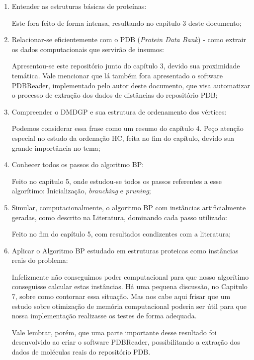 \documentclass[a4paper,12pt]{article}
\begin{document}
	\begin{enumerate}
		\item Entender as estruturas básicas de proteínas:
			
			Este fora feito de forma intensa, resultando no capítulo 3 deste documento;
		
		\item Relacionar-se eficientemente com o PDB (\emph{Protein Data Bank}) - como extrair os dados computacionais que servirão de insumos:
		
			Apresentou-se este repositório junto do capítulo 3, devido sua proximidade temática. Vale mencionar que lá também fora apresentado o software PDBReader, implementado pelo autor deste documento, que visa automatizar o processo de extração dos dados de distâncias do repositório PDB;
		
		\item Compreender o DMDGP e sua estrutura de ordenamento dos vértices:
		
			Podemos considerar essa frase como um resumo do capítulo 4. Peço atenção especial no estudo da ordenação HC, feita no fim do capítulo, devido sua grande importância no tema;
		
		\item Conhecer todos os passos do algoritmo BP:
		
			Feito no capítulo 5, onde estudou-se todos os passos referentes a esse algorítimo: Inicialização, \textit{branching} e \textit{pruning};
		
		\item Simular, computacionalmente, o algoritmo BP com instâncias artificialmente geradas, como descrito na Literatura, dominando cada passo utilizado:
		
			Feito no fim do capítulo 5, com resultados condizentes com a literatura;
			
		\item Aplicar o Algoritmo BP estudado em estruturas proteicas como instâncias reais do problema:
		
			Infelizmente não conseguimos poder computacional para que nosso algorítimo conseguisse calcular estas instâncias. Há uma pequena discussão, no Capitulo 7, sobre como contornar essa situação. Mas nos cabe aqui frisar que um estudo sobre otimização de memória computacional poderia ser útil para que nossa implementação realizasse os testes de forma adequada.
			
			Vale lembrar, porém, que uma parte importante desse resultado foi desenvolvido ao criar o software PDBReader, possibilitando a extração dos dados de moléculas reais do repositório PDB.
	\end{enumerate}
	
\end{document}
